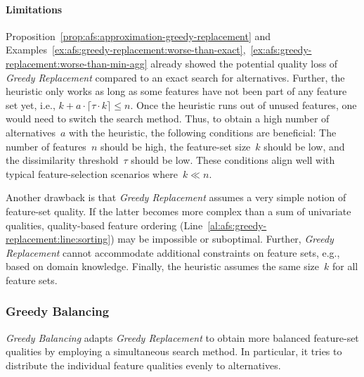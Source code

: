 \documentclass{article}
\theoremstyle{definition}
\begin{document}
\paragraph{Limitations}

Proposition~\ref{prop:afs:approximation-greedy-replacement} and Examples~\ref{ex:afs:greedy-replacement:worse-than-exact},~\ref{ex:afs:greedy-replacement:worse-than-min-agg} already showed the potential quality loss of \emph{Greedy Replacement} compared to an exact search for alternatives.
Further, the heuristic only works as long as some features have not been part of any feature set yet, i.e., $k + a \cdot \lceil \tau \cdot k \rceil \leq n$.
Once the heuristic runs out of unused features, one would need to switch the search method.
Thus, to obtain a high number of alternatives~$a$ with the heuristic, the following conditions are beneficial:
The number of features~$n$ should be high, the feature-set size~$k$ should be low, and the dissimilarity threshold~$\tau$ should be low.
These conditions align well with typical feature-selection scenarios where~$k \ll n$.

Another drawback is that \emph{Greedy Replacement} assumes a very simple notion of feature-set quality.
If the latter becomes more complex than a sum of univariate qualities, quality-based feature ordering (Line~\ref{al:afs:greedy-replacement:line:sorting}) may be impossible or suboptimal.
Further, \emph{Greedy Replacement} cannot accommodate additional constraints on feature sets, e.g., based on domain knowledge.
Finally, the heuristic assumes the same size~$k$ for all feature sets.

\subsubsection{Greedy Balancing}
\label{sec:afs:approach:univariate-heuristics:greedy-balancing}

\emph{Greedy Balancing} adapts \emph{Greedy Replacement} to obtain more balanced feature-set qualities by employing a simultaneous search method.
In particular, it tries to distribute the individual feature qualities evenly to alternatives.
\end{document}
